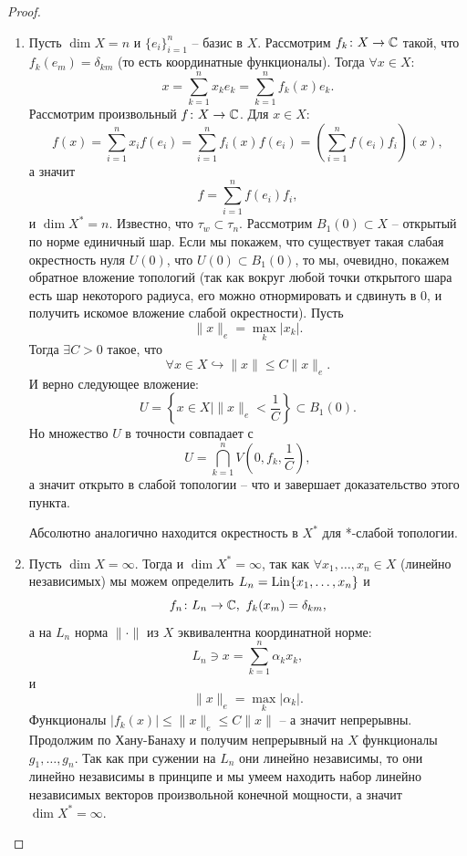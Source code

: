 \begin{proof} \leavevmode
    \begin{enumerate}
        \item Пусть $\dim X = n$ и $\{e_i\}_{i = 1}^{n}$ -- базис в $X$.
        Рассмотрим $f_k\colon X \to \mathbb{C}$ такой, что $f_k(e_m) = \delta_{km}$ (то есть координатные функционалы).
        Тогда $\forall x \in X\colon$
        \[
            x = \sum_{k = 1}^{n} x_k e_k = \sum_{k = 1}^{n} f_k(x)e_k.
        \]
        Рассмотрим произвольный $f\colon X \to \mathbb{C}$.
        Для $x \in X\colon$
        \[
            f(x) = \sum_{i = 1}^{n} x_i f(e_i) = \sum_{i = 1}^{n} f_i(x)f(e_i) = \left(\sum_{i = 1}^{n} f(e_i)f_i\right)(x),
        \]
        а значит
        \[
            f = \sum_{i = 1}^{n} f(e_i)f_i,
        \]
        и $\dim X^* = n$.
        Известно, что $\tau_w \subset \tau_n$.
        Рассмотрим $B_1(0) \subset X$ -- открытый по норме единичный шар.
        Если мы покажем, что существует такая слабая окрестность нуля $U(0)$, что $U(0) \subset B_1(0)$, то мы, очевидно, покажем обратное вложение топологий (так как вокруг любой точки открытого шара есть шар некоторого радиуса, его можно отнормировать и сдвинуть в 0, и получить искомое вложение слабой окрестности).
        Пусть
        \[
            \|x\|_e = \max\limits_{k} |x_k|.
        \]
        Тогда $\exists C > 0$ такое, что
        \[
            \forall x \in X \hookrightarrow \|x\| \leq C\|x\|_e.
        \]
        И верно следующее вложение:
        \[
            U = \left\{x \in X \mid \|x\|_e < \frac{1}{C}\right\} \subset B_1(0).
        \]
        Но множество $U$ в точности совпадает с
        \[
            U = \bigcap_{k = 1}^{n} V\left(0, f_k, \frac{1}{C}\right),
        \]
        а значит открыто в слабой топологии -- что и завершает доказательство этого пункта.

        Абсолютно аналогично находится окрестность в $X^*$ для *-слабой топологии.
        \item Пусть $\dim X = \infty$.
        Тогда и $\dim X^* = \infty$, так как $\forall x_1, \ldots, x_n \in X$ (линейно независимых) мы можем определить $L_n = \operatorname{Lin}\{x_1, \ldots, x_n\}$ и
        \[
            f_n \colon L_n \to \mathbb{C}, \ f_k(x_m) = \delta_{km},
        \]
        а на $L_n$ норма $\|\cdot\|$ из $X$ эквивалентна координатной норме:
        \[
            L_n \ni x = \sum_{k = 1}^{n} \alpha_k x_k,
        \]
        и
        \[
            \|x\|_e = \max\limits_{k} |\alpha_k|.
        \]
        Функционалы $|f_k(x)| \leq \|x\|_e \leq C\|x\|$ -- а значит непрерывны.
        Продолжим по Хану-Банаху и получим непрерывный на $X$ функционалы $g_1, \ldots, g_n$.
        Так как при сужении на $L_n$ они линейно независимы, то они линейно независимы в принципе и мы умеем находить набор линейно независимых векторов произвольной конечной мощности, а значит $\dim X^* = \infty$.


\end{enumerate}
\end{proof}
